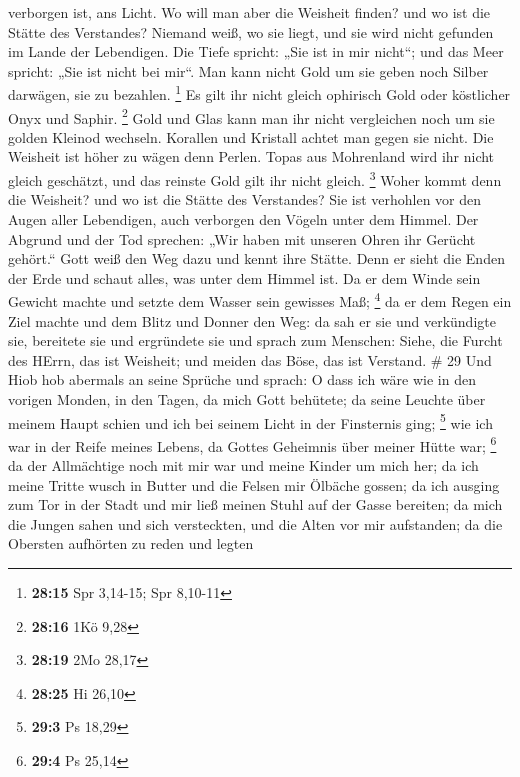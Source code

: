 verborgen ist, ans Licht.  Wo will man aber die Weisheit
finden? und wo ist die Stätte des Verstandes?  Niemand
weiß, wo sie liegt, und sie wird nicht gefunden im Lande der Lebendigen.
 Die Tiefe spricht: „Sie ist in mir nicht``; und das Meer
spricht: „Sie ist nicht bei mir``.  Man kann nicht Gold um
sie geben noch Silber darwägen, sie zu bezahlen. \footnote{\textbf{28:15}
  Spr 3,14-15; Spr 8,10-11}  Es gilt ihr nicht gleich
ophirisch Gold oder köstlicher Onyx und Saphir. \footnote{\textbf{28:16}
  1Kö 9,28}  Gold und Glas kann man ihr nicht vergleichen
noch um sie golden Kleinod wechseln.  Korallen und Kristall
achtet man gegen sie nicht. Die Weisheit ist höher zu wägen denn Perlen.
 Topas aus Mohrenland wird ihr nicht gleich geschätzt, und
das reinste Gold gilt ihr nicht gleich. \footnote{\textbf{28:19} 2Mo
  28,17}  Woher kommt denn die Weisheit? und wo ist die
Stätte des Verstandes?  Sie ist verhohlen vor den Augen
aller Lebendigen, auch verborgen den Vögeln unter dem Himmel.
 Der Abgrund und der Tod sprechen: „Wir haben mit unseren
Ohren ihr Gerücht gehört.``  Gott weiß den Weg dazu und
kennt ihre Stätte.  Denn er sieht die Enden der Erde und
schaut alles, was unter dem Himmel ist.  Da er dem Winde
sein Gewicht machte und setzte dem Wasser sein gewisses Maß; \footnote{\textbf{28:25}
  Hi 26,10}  da er dem Regen ein Ziel machte und dem Blitz
und Donner den Weg:  da sah er sie und verkündigte sie,
bereitete sie und ergründete sie  und sprach zum Menschen:
Siehe, die Furcht des HErrn, das ist Weisheit; und meiden das Böse, das
ist Verstand. \# 29  Und Hiob hob abermals an seine Sprüche
und sprach:  O dass ich wäre wie in den vorigen Monden, in
den Tagen, da mich Gott behütete;  da seine Leuchte über
meinem Haupt schien und ich bei seinem Licht in der Finsternis ging;
\footnote{\textbf{29:3} Ps 18,29}  wie ich war in der Reife
meines Lebens, da Gottes Geheimnis über meiner Hütte war; \footnote{\textbf{29:4}
  Ps 25,14}  da der Allmächtige noch mit mir war und meine
Kinder um mich her;  da ich meine Tritte wusch in Butter und
die Felsen mir Ölbäche gossen;  da ich ausging zum Tor in
der Stadt und mir ließ meinen Stuhl auf der Gasse bereiten; 
da mich die Jungen sahen und sich versteckten, und die Alten vor mir
aufstanden;  da die Obersten aufhörten zu reden und legten
